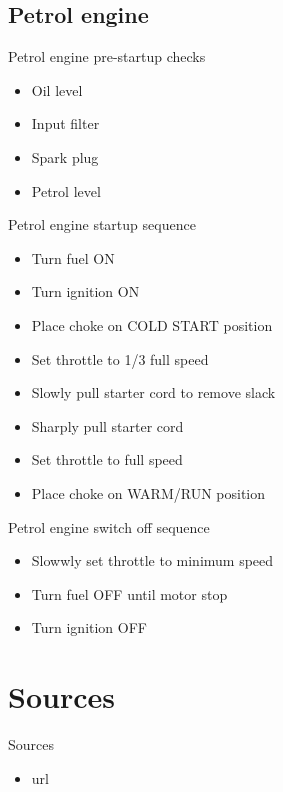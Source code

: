 \documentclass[aspectratio=1610,english,12pt]{beamer}
\begin{document}
\subsection{Petrol engine}
\begin{frame}{Petrol engine pre-startup checks}
	\begin{itemize}
			\item Oil level
			\item Input filter
			\item Spark plug
			\item Petrol level
		\end{itemize}	
\end{frame}

\begin{frame}{Petrol engine startup sequence}
	\begin{itemize}
		\item Turn fuel ON
		\item Turn ignition ON
		\item Place choke on COLD START position
		\item Set throttle to 1/3 full speed
		\item Slowly pull starter cord to remove slack
		\item Sharply pull starter cord
		\item Set throttle to full speed
		\item Place choke on WARM/RUN position
	\end{itemize}
\end{frame}

\begin{frame}{Petrol engine switch off sequence}
	\begin{itemize}
		\item Slowwly set throttle to minimum speed
		\item Turn fuel OFF until motor stop
		\item Turn ignition OFF
	\end{itemize}
\end{frame}

\section{Sources}
\begin{frame}{Sources}
    \begin{itemize}
    	\item url
    \end{itemize}
\end{frame}
\end{document}
